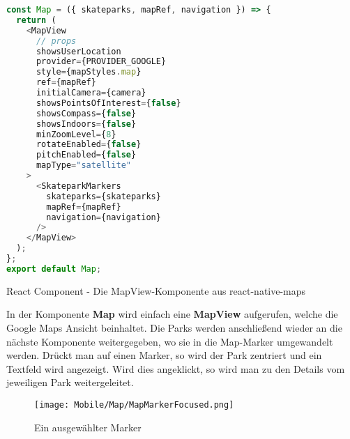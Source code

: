 \begin{code}[htp]
\begin{lstlisting}[firstnumber=1,language=JavaScript, style=JSX]
const Map = ({ skateparks, mapRef, navigation }) => {
  return (
    <MapView
      // props
      showsUserLocation
      provider={PROVIDER_GOOGLE}
      style={mapStyles.map}
      ref={mapRef}
      initialCamera={camera}
      showsPointsOfInterest={false}
      showsCompass={false}
      showsIndoors={false}
      minZoomLevel={8}
      rotateEnabled={false}
      pitchEnabled={false}
      mapType="satellite"
    >
      <SkateparkMarkers
        skateparks={skateparks}
        mapRef={mapRef}
        navigation={navigation}
      />
    </MapView>
  );
};
export default Map;
\end{lstlisting}
\caption{React Component - Die MapView-Komponente aus react-native-maps}
\end{code}

In der Komponente \textbf{Map} wird einfach eine \textbf{MapView} aufgerufen, welche die Google Maps Ansicht
beinhaltet. Die Parks werden anschließend wieder an die nächste Komponente weitergegeben, wo sie in
die Map-Marker umgewandelt werden. Drückt man auf einen Marker, so wird der Park zentriert und ein
Textfeld wird angezeigt. Wird dies angeklickt, so wird man zu den Details vom jeweiligen Park
weitergeleitet.

\begin{figure}[H]
  \begin{center}
    \texttt{[image: Mobile/Map/MapMarkerFocused.png]}
    \caption{Ein ausgewählter Marker}
  \end{center}
\end{figure}
